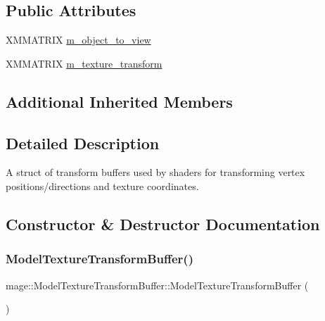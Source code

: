 \subsection*{Public Attributes}
\begin{DoxyCompactItemize}
\item 
X\+M\+M\+A\+T\+R\+IX \hyperlink{structmage_1_1_model_texture_transform_buffer_adb5e9e5b5d8c48267f0947c1ebc67b27}{m\+\_\+object\+\_\+to\+\_\+view}
\item 
X\+M\+M\+A\+T\+R\+IX \hyperlink{structmage_1_1_model_texture_transform_buffer_aec121458581c6508c8caaab65b073b73}{m\+\_\+texture\+\_\+transform}
\end{DoxyCompactItemize}
\subsection*{Additional Inherited Members}


\subsection{Detailed Description}
A struct of transform buffers used by shaders for transforming vertex positions/directions and texture coordinates. 

\subsection{Constructor \& Destructor Documentation}
\hypertarget{structmage_1_1_model_texture_transform_buffer_a500d8232f1350b0beccc2181951309d6}{}\label{structmage_1_1_model_texture_transform_buffer_a500d8232f1350b0beccc2181951309d6} 
\subsubsection{\texorpdfstring{Model\+Texture\+Transform\+Buffer()}{ModelTextureTransformBuffer()}\hspace{0.1cm}{\footnotesize\ttfamily [1/3]}}
{\footnotesize\ttfamily mage\+::\+Model\+Texture\+Transform\+Buffer\+::\+Model\+Texture\+Transform\+Buffer (\begin{DoxyParamCaption}{ }\end{DoxyParamCaption})}

